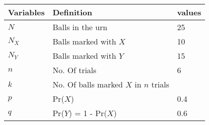 \begin{tabular}{|l|l|l|}\hline
	Variables	&Definition &values\\ \hline
	$N$ &Balls in the urn & 25\\ \hline
	$N_X$ &Balls marked with $X$ & 10\\ \hline
	$N_Y$ &Balls marked with $Y$ & 15\\ \hline
	$n$	&No. Of trials & 6\\ \hline
	$k$	&No. Of balls marked $X$ in $n$ trials & \\ \hline
	$p$	&Pr($X$) & 0.4\\ \hline
	$q$	&Pr($Y$) = 1 - Pr($X$) & 0.6\\	\hline
\end{tabular}

